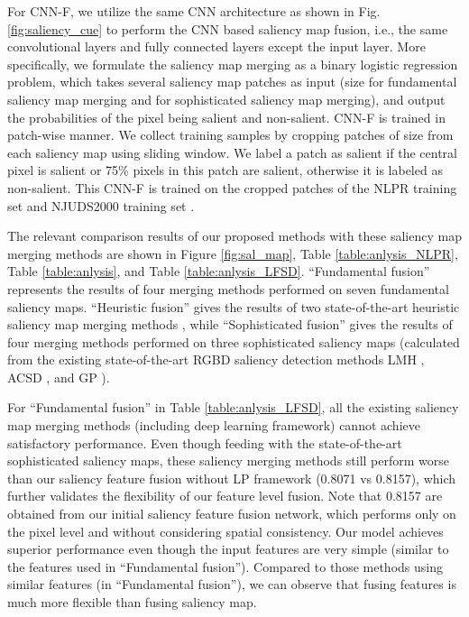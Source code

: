 \documentclass[journal]{IEEEtran}
\begin{document}
For CNN-F, we utilize the same CNN architecture as shown in Fig. \ref{fig:saliency_cue} to perform the CNN based saliency map fusion, i.e., the same convolutional layers and fully connected layers except the input layer.
More specifically, we formulate the saliency map merging as a binary logistic regression problem, which takes several saliency map patches as input (size  for fundamental saliency map merging and  for sophisticated saliency map merging), and output the probabilities of the pixel being salient and non-salient. CNN-F is trained in patch-wise manner. We collect training samples by cropping patches of size  from each saliency map using sliding window. We label a patch as salient if the central pixel is salient or 75\% pixels in this patch are salient, otherwise it is labeled as non-salient. This CNN-F is trained on the cropped patches of the NLPR training set \cite{peng2014rgbd} and NJUDS2000 training set \cite{ju2014depth}.


The relevant comparison results of our proposed methods with these saliency map merging methods are shown in Figure \ref{fig:sal_map},
Table \ref{table:anlysis_NLPR}, Table \ref{table:anlysis}, and Table \ref{table:anlysis_LFSD}.  ``Fundamental fusion'' represents the results of four merging methods performed on seven fundamental saliency maps. ``Heuristic fusion'' gives the results of two state-of-the-art heuristic saliency map merging methods \cite{peng2014rgbd,ren2015exploiting}, while ``Sophisticated fusion'' gives the results of four merging methods performed on three sophisticated saliency maps (calculated from the existing state-of-the-art RGBD saliency detection methods LMH
\cite{peng2014rgbd}, ACSD \cite{ju2014depth}, and GP \cite{ren2015exploiting}).

For ``Fundamental fusion'' in Table \ref{table:anlysis_LFSD}, all the existing saliency map merging methods (including deep learning framework) cannot achieve satisfactory  performance.
Even though feeding with the state-of-the-art sophisticated saliency maps, these saliency merging methods still perform worse than our saliency feature fusion without LP
framework (0.8071 vs 0.8157), which further validates the flexibility of our feature level fusion. Note that 0.8157 are obtained from our initial saliency feature fusion network, which performs only on the pixel level and without considering spatial consistency. Our model achieves superior performance even though the input features are very simple (similar to the features used in ``Fundamental fusion''). Compared to those methods using similar features (in ``Fundamental fusion''), we can observe that fusing features is much more flexible than fusing saliency map.
\end{document}

